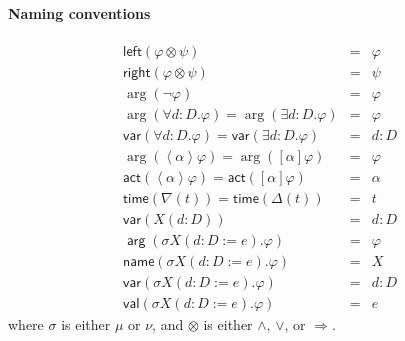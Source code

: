 \documentclass{article}
\begin{document}
\paragraph{Naming conventions}

\begin{equation*}
\begin{array}{lcl}
\mathsf{left}(\varphi \otimes \psi ) & = & \varphi \\ 
\mathsf{right}(\varphi \otimes \psi ) & = & \psi \\ 
\arg (\lnot \varphi ) & = & \varphi \\ 
\arg (\forall d:D.\varphi )=\arg (\exists d:D.\varphi ) & = & \varphi \\ 
\mathsf{var}(\forall d:D.\varphi )=\mathsf{var}(\exists d:D.\varphi ) & = & 
d:D \\ 
\arg (\left\langle \alpha \right\rangle \varphi )=\arg ([\alpha ]\varphi ) & 
= & \varphi \\ 
\mathsf{act}(\left\langle \alpha \right\rangle \varphi )=\mathsf{act}%
([\alpha ]\varphi ) & = & \alpha \\ 
\mathsf{time}(\nabla (t))=\mathsf{time}(\Delta (t)) & = & t \\ 
\mathsf{var}(X(d:D)) & = & d:D \\ 
\mathsf{\arg }(\sigma X(d:D:=e).\varphi ) & = & \varphi \\ 
\mathsf{name}(\sigma X(d:D:=e).\varphi ) & = & X \\ 
\mathsf{var}(\sigma X(d:D:=e).\varphi ) & = & d:D \\ 
\mathsf{val}(\sigma X(d:D:=e).\varphi ) & = & e%
\end{array}%
\end{equation*}%
where $\sigma $ is either $\mu $ or $\nu $, and $\otimes $ is either $\wedge 
$, $\vee $, or $\Rightarrow $.
\end{document}
